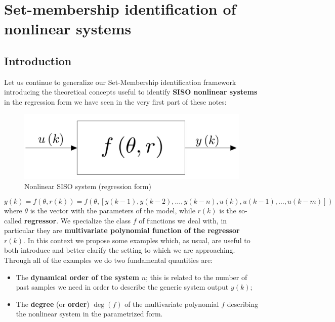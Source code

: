 \chapter[SM-ID of block structured nonlinear systems]{Set-membership identification of  nonlinear systems}

\section{Introduction}
Let us continue to generalize our Set-Membership identification framework introducing the theoretical concepts useful to identify \textbf{SISO nonlinear systems} in the regression form we have seen in the very first part of these notes:

\begin{figure}[h]
   \centering
   \includegraphics[scale=0.15]{img/nonlinear.jpeg} 
   \caption{Nonlinear SISO system (regression form)}
\end{figure}
\vspace{-1cm}
\begin{equation}
    y(k)=f(\theta,r(k))=f(\theta, [y(k-1),y(k-2),\dots,y(k-n), u(k), u(k-1), \dots, u(k-m)])
\end{equation}
where $\theta$ is the vector with the parameters of the model, while $r(k)$ is the so-called \textbf{regressor}. We specialize the class $f$ of functions we deal with, in particular they are \textbf{multivariate polynomial function of the regressor $r(k)$}. In this context we propose some examples which, as usual, are useful to both introduce and better clarify the setting to which we are approaching. Through all of the examples we do two fundamental quantities are:
\begin{itemize}
    \item The \textbf{dynamical order of the system} $n$; this is related to the number of past samples we need in order to describe the generic system output $y(k)$; 
    \item The \textbf{degree} (or \textbf{order}) $\deg(f)$ of the multivariate polynomial $f$ describing the nonlinear system in the parametrized form.
\end{itemize}

